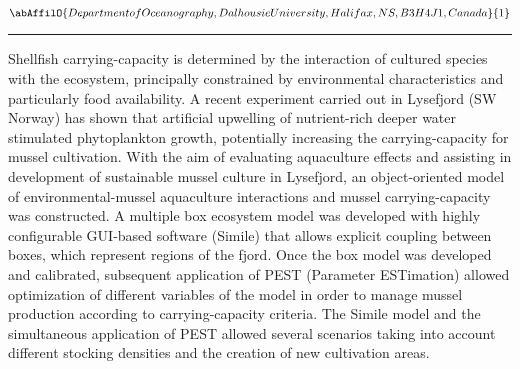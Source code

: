 \begin{minipage}{\linewidth}\begin{center}\begin{minipage}{\linewidth}
   \vspace{2 mm} \begin{center}
    \vspace{2 mm}\begin{center}
  
  $\abAffilO{Department of Oceanography, Dalhousie University, Halifax, NS, B3H 4J1, Canada}{1}$

  \end{center}
  \vspace{2 mm}
  \end{center}\end{minipage}\end{center}
  \begin{center}\rule{0.70\linewidth}{0.5 pt}\end{center}
  \begin{minipage}{\linewidth}
\noindent Shellfish carrying-capacity is determined by the interaction of cultured species with the ecosystem, principally constrained by environmental characteristics and particularly food availability. A recent experiment carried out in Lysefjord (SW Norway) has shown that artificial upwelling of nutrient-rich deeper water stimulated phytoplankton growth, potentially increasing the carrying-capacity for mussel cultivation. With the aim of evaluating aquaculture effects and assisting in development of sustainable mussel culture in Lysefjord, an object-oriented model of environmental-mussel aquaculture interactions and mussel carrying-capacity was constructed. A multiple box ecosystem model was developed with highly configurable GUI-based software (Simile) that allows explicit coupling between boxes, which represent regions of the fjord. Once the box model was developed and calibrated, subsequent application of PEST (Parameter ESTimation) allowed optimization of different variables of the model in order to manage mussel production according to carrying-capacity criteria. The Simile model and the simultaneous application of PEST allowed several scenarios taking into account different stocking densities and the creation of new cultivation areas.
\end{minipage}\end{minipage}
